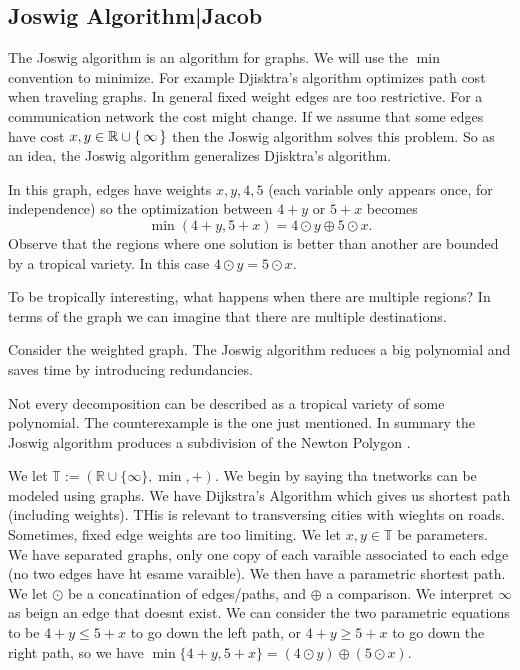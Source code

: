 \documentclass[12pt]{memoir}
\theoremstyle{definition}
\def\RR{{\mathbb R}}
\def\TT{{\mathbb T}}
\begin{document}
\subsection{Joswig Algorithm|Jacob}

The Joswig algorithm is an algorithm for graphs. We will use the $\min$ convention to minimize. For example Djisktra's algorithm optimizes path cost when traveling graphs. In general fixed weight edges are too restrictive. For a communication network the cost might change. If we assume that some edges have cost $x,y\in\mathbb{R}\cup\{\,\infty\,\}$ then the Joswig algorithm solves this problem. So as an idea, the Joswig algorithm generalizes Djisktra's algorithm.
\begin{Ex}
    In this graph, edges have weights $x,y,4,5$ (each variable only appears once, for independence) so the optimization between $4+y$ or $5+x$ becomes 
    $$\min(4+y,5+x)=4\odot y\oplus5\odot x.$$
    Observe that the regions where one solution is better than another are bounded by a tropical variety. In this case $4\odot y=5\odot x$.
\end{Ex}

To be tropically interesting, what happens when there are multiple regions? In terms of the graph we can imagine that there are multiple destinations.

\begin{Ex}
    Consider the weighted graph. The Joswig algorithm reduces a big polynomial and saves time by introducing redundancies.
\end{Ex}

Not every decomposition can be described as a tropical variety of some polynomial. The counterexample is the one just mentioned. In summary the Joswig algorithm produces a subdivision of the Newton Polygon .



We let $\TT:=(\RR\cup\{\infty\}, \min, +)$. We begin by saying tha tnetworks can be modeled using graphs. We have Dijkstra's Algorithm which gives us shortest path (including weights). THis is relevant to transversing cities with wieghts on roads. Sometimes, fixed edge weights are too limiting. We let $x,y \in \TT$ be parameters. We have separated graphs, only one copy of each varaible associated to each edge (no two edges have ht esame varaible). We then have  a parametric shortest path. We let $\odot$ be a concatination of edges/paths, and $\oplus$ a comparison. We interpret $\infty$ as beign an edge that doesnt exist. We can consider the two parametric equations to be $4+y \leq 5+x$ to go down the left path, or $4+y \geq 5+x$ to go down the right path, so we have $\min\{4+y,5+x\} = (4\odot y) \oplus (5\odot x)$.
\end{document}
